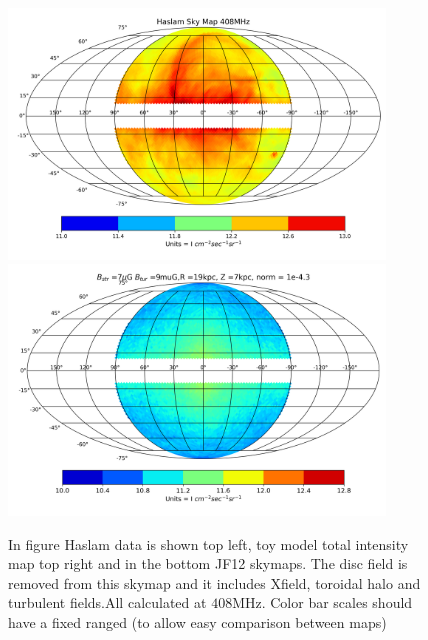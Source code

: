 \documentclass[12pt, a4 paper]{mnras}
\newcommand{\Andrew}[1]{\textcolor{dg}{#1}}
\begin{document}
\begin{figure}[h!]
    \centering
    \includegraphics[width = 10cm]{Images/Haslam_408MHz.png}
    \includegraphics[width =
    10cm]{Images/408MHz_TI_Spec_Ind_3.0_Bstr_7_Btur_9_R_19_Z_7_norm_4.3.png}
    \caption{In figure Haslam data is shown top left, toy model total intensity map top right and in the bottom JF12 skymaps. The disc field is removed from this skymap and it includes Xfield, toroidal halo and turbulent fields.All calculated at $408$MHz. \Andrew{Color bar scales should have a fixed ranged (to allow easy comparison between maps)}}
    \label{fig:my_label}
\end{figure}

\fi
\end{document}
